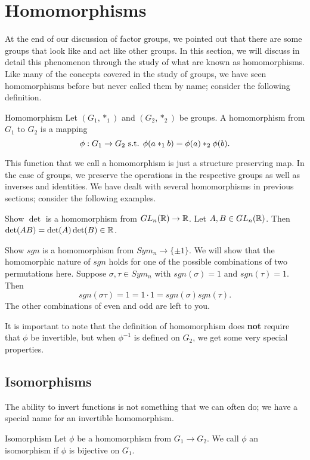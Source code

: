 \section{Homomorphisms}

At the end of our discussion of factor groups, we pointed out that there are some groups that look like and act like other groups.
In this section, we will discuss in detail this phenomenon through the study of what are known as homomorphisms.
Like many of the concepts covered in the study of groups, we have seen homomorphisms before but never called them by name; consider the following definition.

\begin{definition}{Homomorphism}
    Let $(G_{1},*_{1})$ and $(G_{2},*_{2})$ be groups. A homomorphism from $G_{1}$ to $G_{2}$ is a mapping
    \[
        \phi: G_{1}\to G_{2}\text{ s.t. } \phi(a*_{1}b)=\phi(a)*_{2}\phi(b).
    \]
\end{definition}
This function that we call a homomorphism is just a structure preserving map.
In the case of groups, we preserve the operations in the respective groups as well as inverses and identities.
We have dealt with several homomorphisms in previous sections; consider the following examples.

\begin{example}{Show $\det$ is a homomorphism from $GL_{n}(\mathbb{R})\to\mathbb{R}$.}
    Let $A,B\in GL_{n}(\mathbb{R})$. Then $\det(AB)=\det(A)\det(B)\in\mathbb{R}$.
\end{example}

\begin{example}{Show $sgn$ is a homomorphism from $Sym_{n}\to\{\pm1\}$.}
    We will show that the homomorphic nature of $sgn$ holds for one of the possible combinations of two permutations here.
    Suppose $\sigma,\tau\in Sym_{n}$ with $sgn(\sigma)=1$ and $sgn(\tau)=1$. Then
    \[
        sgn(\sigma\tau)=1=1\cdot 1=sgn(\sigma)sgn(\tau).
    \]
    The other combinations of even and odd are left to you.
\end{example}

It is important to note that the definition of homomorphism does \textbf{not} require that $\phi$ be invertible, but when $\phi^{-1}$ is defined on $G_{2}$, we get some very special properties.

\subsection*{Isomorphisms}
The ability to invert functions is not something that we can often do; we have a special name for an invertible homomorphism.
\begin{definition}{Isomorphism}
    Let $\phi$ be a homomorphism from $G_{1}\to G_{2}$. We call $\phi$ an isomorphism if $\phi$ is bijective on $G_{1}$.
\end{definition}
